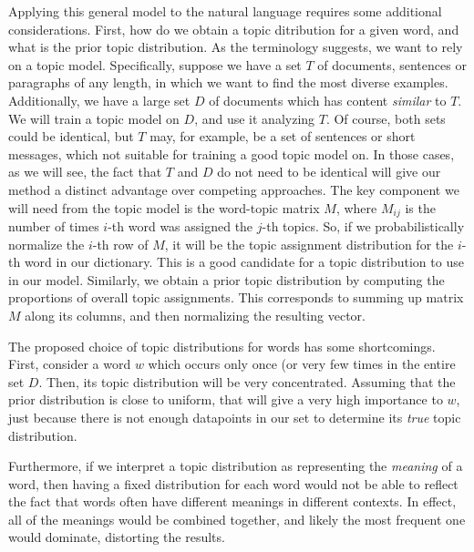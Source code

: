  Applying this general model to the natural language requires some
 additional considerations. First, how do we obtain a topic
 ditribution for a given word, and what is the prior topic
 distribution. As the terminology suggests, we want to rely on a topic
 model. Specifically, suppose we have a set $T$ of documents, sentences or
 paragraphs of any length, in which we want to find the most diverse
 examples. Additionally, we have a large set $D$ of documents which
 has content {\em similar} to $T$. We will train a topic model on $D$,
 and use it analyzing $T$. Of course, both sets could be identical,
 but $T$ may, for example, be a set of sentences or short messages,
which not suitable for training a good topic model on. In those cases,
as we will see, the fact that $T$ and $D$ do not 
 need to be identical will give our method a distinct advantage over
 competing approaches. The key component we will need from the topic
 model is the word-topic matrix $M$, where $M_{ij}$ is the number of
 times $i$-th word was assigned the $j$-th topics. So, if we
 probabilistically normalize
 the $i$-th row of $M$, it will be the topic assignment distribution
 for the $i$-th word in our dictionary. This is a good candidate for a
 topic distribution to use in our model. Similarly, we obtain a prior
 topic distribution by computing the proportions of overall topic
 assignments. This corresponds to summing up matrix $M$ along its
 columns, and then normalizing the resulting vector.

The proposed choice of topic distributions for words has some
shortcomings. First, consider a word $w$ which occurs only once (or very
few times in the entire set $D$. Then, its topic distribution will be
very concentrated. Assuming that the prior distribution is close to
uniform, that will give a very high importance to $w$, just because
there is not enough datapoints in our set to determine its {\em true}
topic distribution. 

Furthermore, if we interpret a topic distribution as representing the
{\em meaning} of a word, then having a fixed distribution for each
word would not be able to reflect the fact that words often have
different meanings in different contexts. In effect, all of the
meanings would be combined together, and likely the most frequent one
would dominate, distorting the results.




